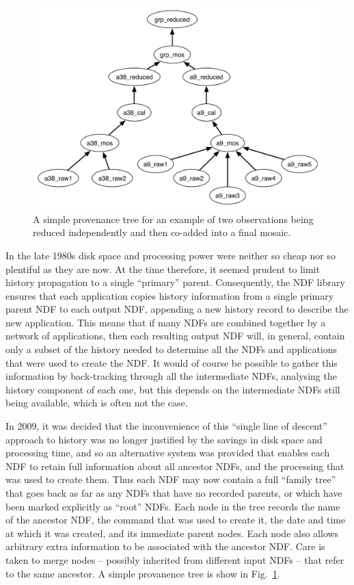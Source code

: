 \documentclass[final,authoryear,5p,times,twocolumn]{elsarticle}
\begin{document}
\begin{figure}
\includegraphics[width=\columnwidth]{provenance.pdf}
\caption{A simple provenance tree for an example of two observations
  being reduced independently and then co-added into a final
  mosaic.}
\label{fig:prov}
\end{figure}

In the late 1980s disk space and processing power were neither so
cheap nor so plentiful as they are now. At the time therefore, it
seemed prudent to limit history propagation to a single ``primary''
parent. Consequently, the NDF library ensures that each application
copies history information from a single primary parent NDF to each
output NDF, appending a new history record to describe the new
application. This means that if many NDFs are combined together by a
network of applications, then each resulting output NDF will, in
general, contain only a subset of the history needed to determine all
the NDFs and applications that were used to create the NDF. It would
of course be possible to gather this information by back-tracking
through all the intermediate NDFs, analysing the history component of
each one, but this depends on the intermediate NDFs still being
available, which is often not the case.

In 2009, it was decided that the inconvenience of this ``single line of
descent'' approach to history was no longer justified by the savings in
disk space and processing time, and so an alternative system was
provided that enables each NDF to retain full information about all
ancestor NDFs, and the processing that was used to create them. Thus
each NDF may now contain a full ``family tree'' that goes back as far as
any NDFs that have no recorded parents, or which have been marked
explicitly as ``root'' NDFs. Each node in the tree records the name of
the ancestor NDF, the command that was used to create it, the date and
time at which it was created, and its immediate parent nodes. Each
node also allows arbitrary extra information to be associated with the
ancestor NDF. Care is taken to merge nodes -- possibly inherited from
different input NDFs -- that refer to the same ancestor. A simple
provanence tree is show in Fig.\ \ref{fig:prov}.
\end{document}
